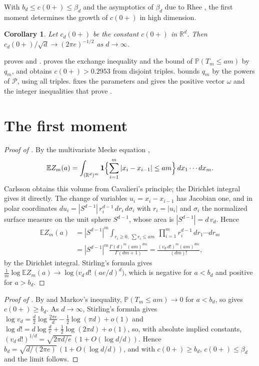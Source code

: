 \documentclass[11pt]{article}
\newtheorem{corollary}[theorem]{Corollary}
\theoremstyle{remark}
\newcommand{\R}{\mathbb{R}}
\newcommand{\E}{\mathbb{E}}
\newcommand{\Prob}{\mathbb{P}}
\begin{document}
With $b_d\le c(0+)\le\beta_d$ and the asymptotics of $\beta_d$ due to Rhee \cite{Rhee}, the first moment determines
the growth of $c(0+)$ in high dimension.

\begin{corollary}\label{cor:asym}
Let $c_d(0+)$ be the constant $c(0+)$ in $\R^d$. Then $c_d(0+)/\sqrt d\to(2\pi e)^{-1/2}$ as $d\to\infty$.
\end{corollary}

 proves  and .  proves the exchange inequality and
the bound of $\Prob(T_m\le am)$ by $q_m$, and obtains $c(0+)>0.2953$ from disjoint triples.  bounds
$q_m$ by the powers of $\mathcal P$, using all triples.  fixes the parameters and gives the positive vector $\omega$ and
the integer inequalities that prove .

\section{The first moment}\label{sec:first}

\begin{proof}[Proof of ]
By the multivariate Mecke equation \cite[Theorem~4.4]{LP},
\[
\E Z_m(a)=\int_{(\R^d)^m}\mathbf 1\Bigl\{\sum_{i=1}^m|x_i-x_{i-1}|\le am\Bigr\}\,dx_1\cdots dx_m .
\]
Carlsson obtains this volume from Cavalieri's principle; the Dirichlet integral gives it directly. The change of variables $u_i=x_i-x_{i-1}$ has Jacobian one, and in polar coordinates $du_i=|S^{d-1}|\,r_i^{d-1}\,dr_i\,
d\sigma_i$ with $r_i=|u_i|$ and $\sigma_i$ the normalized surface measure on the unit sphere $S^{d-1}$, whose area is $|S^{d-1}|=d\,v_d$. Hence
\begin{align*}
\E Z_m(a)&=|S^{d-1}|^m\int_{r_i\ge 0,\ \sum r_i\le am}\ \prod_{i=1}^m r_i^{d-1}\,dr_1\cdots dr_m\\
&=|S^{d-1}|^m\frac{\Gamma(d)^m (am)^{dm}}{\Gamma(dm+1)}=\frac{(v_d\,d!)^m (am)^{dm}}{(dm)!},
\end{align*}
by the Dirichlet integral. Stirling's formula gives
$\frac1m\log\E Z_m(a)\to\log\bigl(v_d\,d!\,(ae/d)^d\bigr)$, which is negative for $a<b_d$ and positive for $a>b_d$.
\end{proof}

\begin{proof}[Proof of ]
By  and Markov's inequality, $\Prob(T_m\le am)\to 0$ for $a<b_d$, so \cite[Theorem~1(e)]{AK} gives
$c(0+)\ge b_d$. As $d\to\infty$, Stirling's formula gives $\log v_d=\frac d2\log\frac{2\pi e}{d}-\frac12\log(\pi d)+o(1)$ and
$\log d!=d\log\frac de+\frac12\log(2\pi d)+o(1)$, so, with absolute implied constants, $(v_d\,d!)^{1/d}=\sqrt{2\pi d/e}\,(1+O(\log d/d))$. Hence
$b_d=\sqrt{d/(2\pi e)}\,(1+O(\log d/d))$, and with $c(0+)\ge b_d$, $c(0+)\le\beta_d$ and \cite{Rhee} the limit
follows.
\end{proof}
\end{document}
